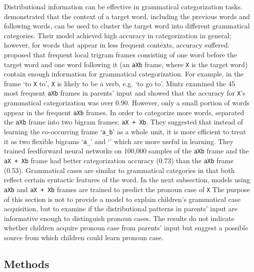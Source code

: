Distributional information can be effective in grammatical categorization tasks. \citet{redington1998distributional} demonstrated that the context of a target word, including the previous words and following words, can be used to cluster the target word into different grammatical categories. Their model achieved high accuracy in categorization in general; however, for words that appear in less frequent contexts, accuracy suffered.  \citet{mintz2003frequent} proposed that frequent local trigram frames consisting of one word before the target word and one word following it (an \texttt{aXb} frame, where \texttt{X} is the target word) contain enough information for grammatical categorization. For example, in the frame `to \texttt{X} to', \texttt{X} is likely to be a verb, e.g. `to go to'. Mintz examined the 45 most frequent \texttt{aXb} frames in parents' input and showed that the accuracy for \texttt{X}'s grammatical categorization was over 0.90. However, only a small portion of words appear in the frequent \texttt{aXb} frames. In order to categorize more words, \citet{clair2010learning} separated the \texttt{aXb} frame into two bigram frames: \texttt{aX + Xb}. They suggested that instead of learning the co-occurring frame `\texttt{a\_b}' as a whole unit, it is more efficient to treat it as two flexible bigrams `\texttt{a\_}' and `' which are more useful in learning.  They trained feedforward neural networks on 100,000 samples of the \texttt{aXb} frame and the \texttt{aX + Xb} frame had better categorization accuracy (0.73) than the \texttt{aXb} frame (0.53). Grammatical cases are similar to grammatical categories in that both reflect certain syntactic features of the word. In the next subsection, models using \texttt{aXb} and \texttt{aX + Xb} frames are trained to predict the pronoun case of \texttt{X}  The purpose of this section is not to provide a model to explain children's grammatical case acquisition, but to examine if the distributional patterns in parents' input are informative enough to distinguish pronoun cases. The results do not indicate whether children acquire pronoun case from parents' input but suggest a possible source from which children could learn pronoun case.

\subsection{Methods}
\label{sec:methods}
